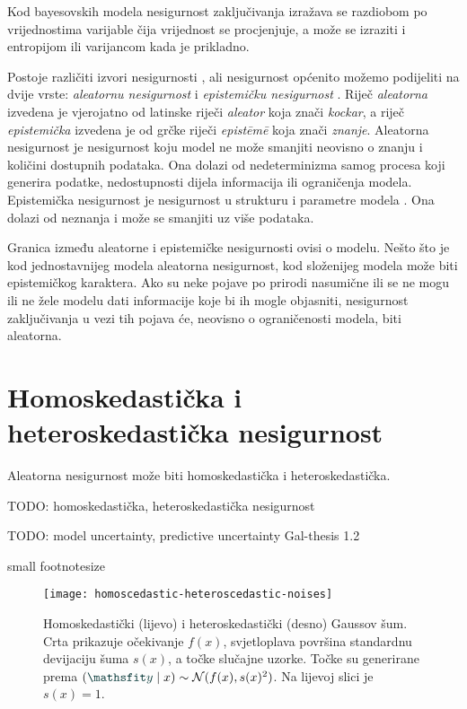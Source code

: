 \documentclass[utf8, diplomski, lmodern]{fer}
\begin{document}
Kod bayesovskih modela nesigurnost zaključivanja izražava se razdiobom po vrijednostima varijable čija vrijednost se procjenjuje, a može se izraziti i entropijom ili varijancom kada je prikladno.

Postoje različiti izvori nesigurnosti \citep{Kennedy:2002:BCCM}, ali nesigurnost općenito možemo podijeliti na dvije vrste: \emph{aleatornu nesigurnost} i \emph{epistemičku nesigurnost} \citep{Kiureghian:2009:AEDM}. Riječ \textit{aleatorna} izvedena je vjerojatno od latinske riječi \textit{aleator} \citep{Gal:2016:UDL} koja znači \textit{kockar}, a riječ \textit{epistemička} izvedena je od grčke riječi \textit{epist\={e}m\={e}} koja znači \textit{znanje}. Aleatorna nesigurnost je nesigurnost koju model ne može smanjiti neovisno o znanju i količini dostupnih podataka. Ona dolazi od nedeterminizma samog procesa koji generira podatke, nedostupnosti dijela informacija ili ograničenja modela. Epistemička nesigurnost je nesigurnost u strukturu i parametre modela \citep{Gal:2016:UDL}. Ona dolazi od neznanja i može se smanjiti uz više podataka.

Granica između aleatorne i epistemičke nesigurnosti ovisi o modelu. Nešto što je kod jednostavnijeg modela aleatorna nesigurnost, kod složenijeg modela može biti epistemičkog karaktera. Ako su neke pojave po prirodi nasumične ili se ne mogu ili ne žele modelu dati informacije koje bi ih mogle objasniti, nesigurnost zaključivanja u vezi tih pojava će, neovisno o ograničenosti modela, biti aleatorna.

\section{Homoskedastička i heteroskedastička nesigurnost}

Aleatorna nesigurnost može biti homoskedastička i heteroskedastička.

TODO: homoskedastička, heteroskedastička nesigurnost

TODO: model uncertainty, predictive uncertainty Gal-thesis 1.2

\the{}\font\newline %
\the{}\font\newline %
small {\small \the{}\font\newline} %
footnotesize {\footnotesize \the{}\font\newline} %
\the\textwidth
		
\begin{figure}
	\centering
	\texttt{[image: homoscedastic-heteroscedastic-noises]}
	\caption{Homoskedastički (lijevo) i heteroskedastički (desno) Gaussov šum.  Crta prikazuje očekivanje $f(x)$, svjetloplava površina standardnu devijaciju šuma $s(x)$, a točke slučajne uzorke. Točke su generirane prema $(\rvar y\mid x) \sim \mathcal{N}(f(x),s(x)^2)$. Na lijevoj slici je $s(x)=1$.}
	\label{fig:homoscedastic-heteroscedastic-noises}
\end{figure}
		
\end{document}
